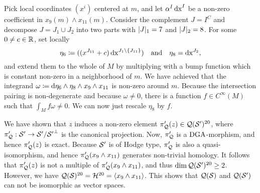 \documentclass[\MainFolder/Text.tex]{subfiles}
\begin{document}
\begin{Example}
Pick local coordinates $(x^i)$ centered at $m$, and let $\alpha^I\operatorname{dx}^I$ be a non-zero coefficient in $x_9(m)\wedge x_{11}(m)$. Consider the complement $J = I^C$ and decompose $J= J_1 \cup J_2$ into two parts with $|J|_1 = 7$ and $|J|_2 = 8$.
For some $0\neq c\in\mathbb{R}$, set locally
\[
\eta_6 \coloneqq ((x^{J_{11}}+c)\operatorname{dx}^{J_1\backslash\{J_{11}\}})\quad\text{and}\quad\eta_8=\operatorname{dx}^{J_2},
\]
and extend them to the whole of $M$ by multiplying with a bump function which is constant non-zero in a neighborhood of $m$.
We have achieved that the integrand $\omega \coloneqq \mathrm{d}\eta_6\wedge \eta_8 \wedge x_9 \wedge x_{11}$ is non-zero around $m$.
Because the intersection pairing is non-degenerate and because $\omega \neq 0$, there is a function $f\in C^\infty(M)$ such that $\int_M f\omega \neq 0$.
We can now just rescale $\eta_8$ by $f$.

We have shown that $z$ induces a non-zero element $\pi_{\mathcal{Q}}'(z)\in \mathcal{Q}(\mathcal{S}')^{20}$, where $\pi_{\mathcal{Q}}': \mathcal{S}' \rightarrow \mathcal{S}'/{\mathcal{S}'}^\perp$ is the canonical projection.
Now, $\pi_{\mathcal{Q}}'$ is a $\mathrm{DGA}$-morphism, and hence $\pi_{\mathcal{Q}}'(z)$ is exact.
Because $\mathcal{S}'$ is of Hodge type, $\pi_{\mathcal{Q}}'$ is also a quasi-isomorphism, and hence $\pi_{\mathcal{Q}}'(x_{9}\wedge x_{11})$ generates non-trivial homology.
It follows that $\pi_{\mathcal{Q}}'(z)$ is not a multiple of $\pi_{\mathcal{Q}}'(x_9\wedge x_{11})$, and thus $\dim \mathcal{Q}(\mathcal{S}')^{20} \ge 2$.
However, we have $\mathcal{Q}(\mathcal{S})^{20} = \mathcal{H}^{20} = \langle x_9\wedge x_{11} \rangle$.
This shows that $\mathcal{Q}(\mathcal{S})$ and $\mathcal{Q}(\mathcal{S}')$ can not be isomorphic as vector spaces.
\end{Example}

\end{document}
